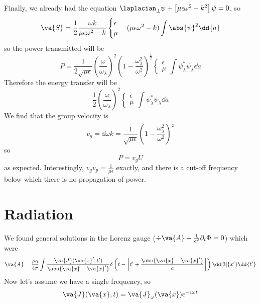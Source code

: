 \documentclass[a4paper,twoside,master.tex]{subfiles}
\begin{document}
Finally, we already had the equation $ \laplacian_{\perp}{\psi} + \left[ \mu \epsilon \omega^2 - k^2 \right] \psi = 0 $, so
\begin{equation}
    \va{S} = \frac{1}{2} \frac{\omega k}{\mu \epsilon \omega^2 - k} \begin{cases} \epsilon \\ \mu \end{cases} (\mu \epsilon \omega^2 - k) \int \abs{\psi}^2 \dd{a}
\end{equation}
so the power transmitted will be
\begin{equation}
    P = \frac{1}{2 \sqrt{\mu \epsilon}} \left( \frac{\omega}{\omega_{\lambda}} \right)^2 \left( 1 - \frac{\omega^2_{\lambda}}{\omega^2} \right)^{\frac{1}{2}} \begin{cases} \epsilon \\ \mu \end{cases} \int \psi^*_{\lambda} \psi_{\lambda} \dd{a}
\end{equation}
Therefore the energy transfer will be
\begin{equation}
    \frac{1}{2} \left( \frac{\omega}{\omega_{\lambda}} \right)^2 \begin{cases} \epsilon \\ \mu \end{cases} \int \psi^*_{\lambda} \psi_{\lambda} \dd{a}
\end{equation}
We find that the group velocity is
\begin{equation}
    v_g = \dd{\omega}{k} = \frac{1}{\sqrt{\mu \epsilon}} \left( 1 - \frac{\omega_{\lambda}^2}{\omega^2} \right)^{\frac{1}{2}}
\end{equation}
so
\begin{equation}
    P = v_g U
\end{equation}
as expected.
Interestingly, $ v_g v_p = \frac{1}{\mu \epsilon} $ exactly, and there is a cut-off frequency below which there is no propagation of power.


\section{Radiation}
\label{sec:radiation}

We found general solutions in the Lorenz gauge ($ \div{ \va{A}} + \frac{1}{c^2} \partial_t \Phi = 0 $) which were
\begin{equation}
    \va{A} = \frac{\mu_0}{4 \pi} \int \frac{ \va{J}( \va{x}', t')}{\abs{\va{x}-\va{x}'}} \delta\left( t - \left[ t' + \frac{\abs{ \va{x} - \va{x}'}}{c} \right] \right) \dd[3]{x'} \dd{t'}
\end{equation}
Now let's assume we have a single frequency, so
\begin{equation}
    \va{J}( \va{x},t) = \va{J}_{\omega}( \va{x}) e^{- \imath \omega t}
\end{equation}
\end{document}
